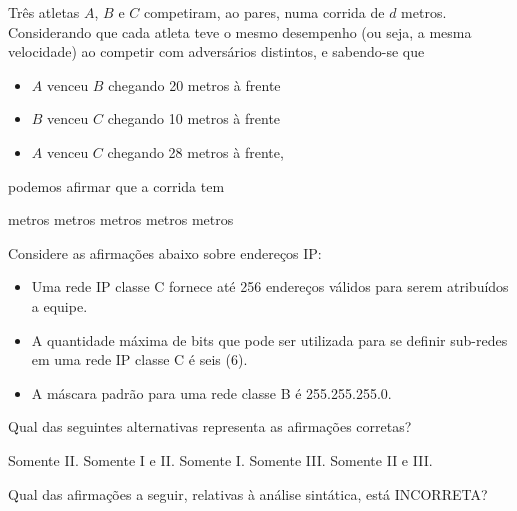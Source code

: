 \documentclass[12pt, addpoints]{exam}
\begin{document}
\begin{questions}
Três atletas \( A \), \( B \) e \( C \) competiram, ao pares, numa corrida de \( d \) metros. Considerando que cada atleta teve o mesmo desempenho (ou seja, a mesma velocidade) ao competir com adversários distintos, e sabendo-se que



\begin{itemize}

    \item \( A \) venceu \( B \) chegando 20 metros à frente

    \item \( B \) venceu \( C \) chegando 10 metros à frente

    \item \( A \) venceu \( C \) chegando 28 metros à frente,

\end{itemize}



podemos afirmar que a corrida tem
\begin{choices}
 metros
 metros
 metros
 metros
 metros
\end{choices}

\question

Considere as afirmações abaixo sobre endereços IP:

\begin{itemize}

    \item[I.] Uma rede IP classe C fornece até 256 endereços válidos para serem atribuídos a equipe.

    \item[II.] A quantidade máxima de bits que pode ser utilizada para se definir sub-redes em uma rede IP classe C é seis (6).

    \item[III.] A máscara padrão para uma rede classe B é 255.255.255.0.

\end{itemize}

Qual das seguintes alternativas representa as afirmações corretas?
\begin{choices}
\choice Somente II.
\choice Somente I e II.
\choice Somente I.
\choice Somente III.
\choice Somente II e III.
\end{choices}

\question

Qual das afirmações a seguir, relativas à análise sintática, está INCORRETA?



\end{questions}
\end{document}
